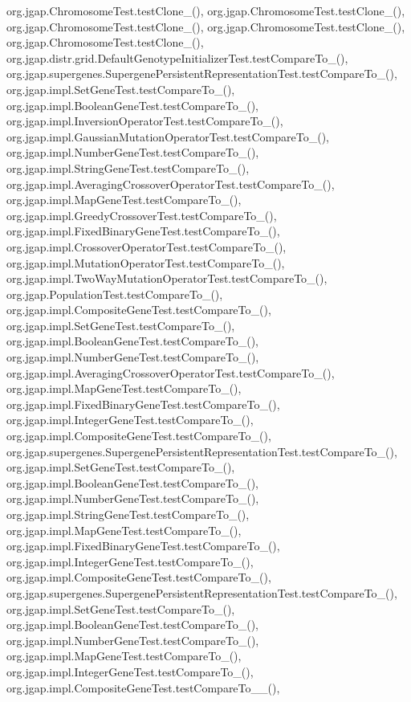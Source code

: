 org.\-jgap.\-Chromosome\-Test.\-test\-Clone\-\_(), org.\-jgap.\-Chromosome\-Test.\-test\-Clone\-\_(), org.\-jgap.\-Chromosome\-Test.\-test\-Clone\-\_(), org.\-jgap.\-Chromosome\-Test.\-test\-Clone\-\_(), org.\-jgap.\-Chromosome\-Test.\-test\-Clone\-\_(), org.\-jgap.\-distr.\-grid.\-Default\-Genotype\-Initializer\-Test.\-test\-Compare\-To\-\_(), org.\-jgap.\-supergenes.\-Supergene\-Persistent\-Representation\-Test.\-test\-Compare\-To\-\_(), org.\-jgap.\-impl.\-Set\-Gene\-Test.\-test\-Compare\-To\-\_(), org.\-jgap.\-impl.\-Boolean\-Gene\-Test.\-test\-Compare\-To\-\_(), org.\-jgap.\-impl.\-Inversion\-Operator\-Test.\-test\-Compare\-To\-\_(), org.\-jgap.\-impl.\-Gaussian\-Mutation\-Operator\-Test.\-test\-Compare\-To\-\_(), org.\-jgap.\-impl.\-Number\-Gene\-Test.\-test\-Compare\-To\-\_(), org.\-jgap.\-impl.\-String\-Gene\-Test.\-test\-Compare\-To\-\_(), org.\-jgap.\-impl.\-Averaging\-Crossover\-Operator\-Test.\-test\-Compare\-To\-\_(), org.\-jgap.\-impl.\-Map\-Gene\-Test.\-test\-Compare\-To\-\_(), org.\-jgap.\-impl.\-Greedy\-Crossover\-Test.\-test\-Compare\-To\-\_(), org.\-jgap.\-impl.\-Fixed\-Binary\-Gene\-Test.\-test\-Compare\-To\-\_(), org.\-jgap.\-impl.\-Crossover\-Operator\-Test.\-test\-Compare\-To\-\_(), org.\-jgap.\-impl.\-Mutation\-Operator\-Test.\-test\-Compare\-To\-\_(), org.\-jgap.\-impl.\-Two\-Way\-Mutation\-Operator\-Test.\-test\-Compare\-To\-\_(), org.\-jgap.\-Population\-Test.\-test\-Compare\-To\-\_(), org.\-jgap.\-impl.\-Composite\-Gene\-Test.\-test\-Compare\-To\-\_(), org.\-jgap.\-impl.\-Set\-Gene\-Test.\-test\-Compare\-To\-\_(), org.\-jgap.\-impl.\-Boolean\-Gene\-Test.\-test\-Compare\-To\-\_(), org.\-jgap.\-impl.\-Number\-Gene\-Test.\-test\-Compare\-To\-\_(), org.\-jgap.\-impl.\-Averaging\-Crossover\-Operator\-Test.\-test\-Compare\-To\-\_(), org.\-jgap.\-impl.\-Map\-Gene\-Test.\-test\-Compare\-To\-\_(), org.\-jgap.\-impl.\-Fixed\-Binary\-Gene\-Test.\-test\-Compare\-To\-\_(), org.\-jgap.\-impl.\-Integer\-Gene\-Test.\-test\-Compare\-To\-\_(), org.\-jgap.\-impl.\-Composite\-Gene\-Test.\-test\-Compare\-To\-\_(), org.\-jgap.\-supergenes.\-Supergene\-Persistent\-Representation\-Test.\-test\-Compare\-To\-\_(), org.\-jgap.\-impl.\-Set\-Gene\-Test.\-test\-Compare\-To\-\_(), org.\-jgap.\-impl.\-Boolean\-Gene\-Test.\-test\-Compare\-To\-\_(), org.\-jgap.\-impl.\-Number\-Gene\-Test.\-test\-Compare\-To\-\_(), org.\-jgap.\-impl.\-String\-Gene\-Test.\-test\-Compare\-To\-\_(), org.\-jgap.\-impl.\-Map\-Gene\-Test.\-test\-Compare\-To\-\_(), org.\-jgap.\-impl.\-Fixed\-Binary\-Gene\-Test.\-test\-Compare\-To\-\_(), org.\-jgap.\-impl.\-Integer\-Gene\-Test.\-test\-Compare\-To\-\_(), org.\-jgap.\-impl.\-Composite\-Gene\-Test.\-test\-Compare\-To\-\_(), org.\-jgap.\-supergenes.\-Supergene\-Persistent\-Representation\-Test.\-test\-Compare\-To\-\_(), org.\-jgap.\-impl.\-Set\-Gene\-Test.\-test\-Compare\-To\-\_(), org.\-jgap.\-impl.\-Boolean\-Gene\-Test.\-test\-Compare\-To\-\_(), org.\-jgap.\-impl.\-Number\-Gene\-Test.\-test\-Compare\-To\-\_(), org.\-jgap.\-impl.\-Map\-Gene\-Test.\-test\-Compare\-To\-\_(), org.\-jgap.\-impl.\-Integer\-Gene\-Test.\-test\-Compare\-To\-\_(), org.\-jgap.\-impl.\-Composite\-Gene\-Test.\-test\-Compare\-To\-\_\-\_(), 